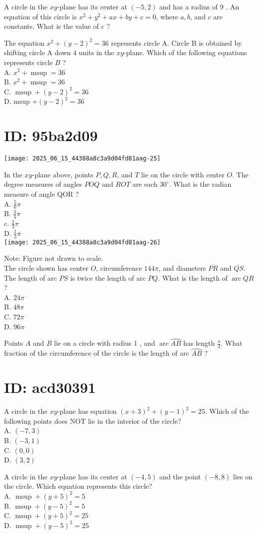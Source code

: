 A circle in the $x y$-plane has its center at $(-5,2)$ and has a radius of 9 . An equation of this circle is $x^{2}+y^{2}+a x+b y+c=0$, where $a, b$, and $c$ are constants. What is the value of $c$ ?

The equation $x^{2}+(y-2)^{2}=36$ represents circle A. Circle B is obtained by shifting circle A down 4 units in the $x y$-plane. Which of the following equations represents circle $B$ ?\\
A. $x^{2}+\operatorname{msup}=36$\\
B. $x^{2}+\operatorname{msup}=36$\\
C. $\operatorname{msup}+(y-2)^{2}=36$\\
D. msup $+(y-2)^{2}=36$

\section*{ID: 95ba2d09}
\begin{center}
\texttt{[image: 2025\_06\_15\_44388a8c3a9d04fd81aag-25]}
\end{center}

In the $x y$-plane above, points $P, Q, R$, and $T$ lie on the circle with center $O$. The degree measures of angles $P O Q$ and $R O T$ are each $30^{\circ}$. What is the radian measure of angle QOR ?\\
A. $\frac{5}{6} \pi$\\
B. $\frac{3}{4} \pi$\\
c. $\frac{2}{3} \pi$\\
D. $\frac{1}{3} \pi$\\
\texttt{[image: 2025\_06\_15\_44388a8c3a9d04fd81aag-26]}

Note: Figure not drawn to scale.\\
The circle shown has center $O$, circumference $144 \pi$, and diameters $\overline{P R}$ and $\overline{Q S}$. The length of arc $P S$ is twice the length of arc $P Q$. What is the length of $\operatorname{arc} Q R$ ?\\
A. $24 \pi$\\
B. $48 \pi$\\
C. $72 \pi$\\
D. $96 \pi$

Points $A$ and $B$ lie on a circle with radius 1 , and $\operatorname{arc} \wideparen{A B}$ has length $\frac{\pi}{3}$. What fraction of the circumference of the circle is the length of arc $\wideparen{A B}$ ?

\section*{ID: acd30391}
A circle in the $x y$-plane has equation $(x+3)^{2}+(y-1)^{2}=25$. Which of the following points does NOT lie in the interior of the circle?\\
A. $(-7,3)$\\
B. $(-3,1)$\\
C. $(0,0)$\\
D. $(3,2)$

A circle in the $x y$-plane has its center at $(-4,5)$ and the point $(-8,8)$ lies on the circle. Which equation represents this circle?\\
A. $\operatorname{msup}+(y+5)^{2}=5$\\
B. $\operatorname{msup}+(y-5)^{2}=5$\\
C. $\operatorname{msup}+(y+5)^{2}=25$\\
D. $\operatorname{msup}+(y-5)^{2}=25$


